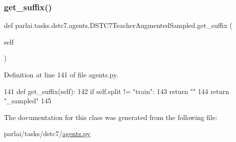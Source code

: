 \subsubsection{\texorpdfstring{get\+\_\+suffix()}{get\_suffix()}}
{\footnotesize\ttfamily def parlai.\+tasks.\+dstc7.\+agents.\+D\+S\+T\+C7\+Teacher\+Augmented\+Sampled.\+get\+\_\+suffix (\begin{DoxyParamCaption}\item[{}]{self }\end{DoxyParamCaption})}



Definition at line 141 of file agents.\+py.


\begin{DoxyCode}
141     \textcolor{keyword}{def }get\_suffix(self):
142         \textcolor{keywordflow}{if} self.split != \textcolor{stringliteral}{"train"}:
143             \textcolor{keywordflow}{return} \textcolor{stringliteral}{""}
144         \textcolor{keywordflow}{return} \textcolor{stringliteral}{"\_sampled"}
145 
\end{DoxyCode}


The documentation for this class was generated from the following file\+:\begin{DoxyCompactItemize}
\item 
parlai/tasks/dstc7/\hyperlink{parlai_2tasks_2dstc7_2agents_8py}{agents.\+py}\end{DoxyCompactItemize}
